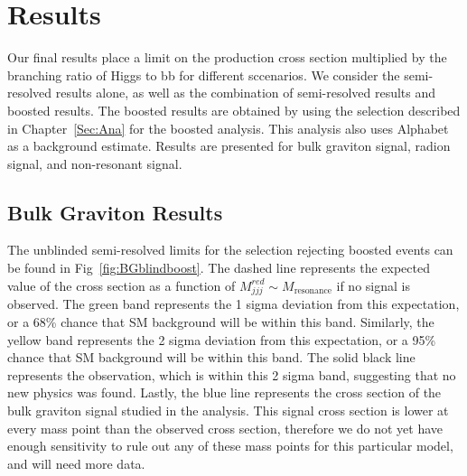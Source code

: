 \chapter{Results}\label{Sec:Results}


Our final results place a limit on the production cross section multiplied by the branching ratio of Higgs to bb for different sccenarios. We consider the semi-resolved results alone, as well as the combination of semi-resolved results and boosted results. The boosted results are obtained by using the selection described in Chapter~\ref{Sec:Ana} for the boosted analysis. This analysis also uses Alphabet as a background estimate. Results are presented for bulk graviton signal, radion signal, and non-resonant signal.

\section{Bulk Graviton Results}

The unblinded semi-resolved limits for the selection rejecting boosted events can be found in Fig~\ref{fig:BGblindboost}. The dashed line represents the expected value of the cross section as a function of $M_{jjj}^{red} \sim M_{\text{resonance}}$ if no signal is observed. The green band represents the 1 sigma deviation from this expectation, or a 68\% chance that SM background will be within this band. Similarly, the yellow band represents the 2 sigma deviation from this expectation, or a 95\% chance that SM background will be within this band. The solid black line represents the observation, which is within this 2 sigma band, suggesting that no new physics was found. Lastly, the blue line represents the cross section of the bulk graviton signal studied in the analysis. This signal cross section is lower at every mass point than the observed cross section, therefore we do not yet have enough sensitivity to rule out any of these mass points for this particular model, and will need more data.

